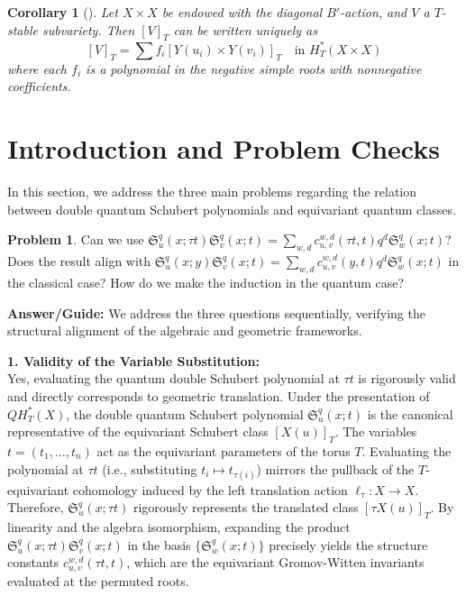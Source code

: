 \documentclass{amsart}
\newtheorem{corollary}[theorem]{Corollary}
\theoremstyle{definition}
\newtheorem{problem}{Problem}
\begin{document}
\begin{corollary}[{\cite[Corollary 6.2]{Mihalcea2006}}]\label{cor:mihalcea_62}
Let $X \times X$ be endowed with the diagonal $B'$-action, and $V$ a $T$-stable subvariety. Then $[V]_T$ can be written uniquely as
$$[V]_T = \sum f_i [Y(u_i) \times Y(v_i)]_T \quad \text{in } H_T^*(X \times X)$$
where each $f_i$ is a polynomial in the negative simple roots with nonnegative coefficients.
\end{corollary}

\section{Introduction and Problem Checks}

In this section, we address the three main problems regarding the relation between double quantum Schubert polynomials and equivariant quantum classes.

\begin{problem}
Can we use $\mathfrak{S}_u^q(x; \tau t) \mathfrak{S}_v^q(x;t) = \sum_{w,d} c_{u,v}^{w,d}(\tau t, t) q^d \mathfrak{S}_w^q(x;t)$? Does the result align with $\mathfrak{S}_u^q(x;y) \mathfrak{S}_v^q(x;t) = \sum_{w,d} c_{u,v}^{w,d}(y, t) q^d \mathfrak{S}_w^q(x;t)$ in the classical case? How do we make the induction in the quantum case?
\end{problem}

\noindent\textbf{Answer/Guide:} We address the three questions sequentially, verifying the structural alignment of the algebraic and geometric frameworks.

\vspace{2mm}
\noindent\textbf{1. Validity of the Variable Substitution:}\\
Yes, evaluating the quantum double Schubert polynomial at $\tau t$ is rigorously valid and directly corresponds to geometric translation. Under the presentation of $QH_T^*(X)$, the double quantum Schubert polynomial $\mathfrak{S}_u^q(x; t)$ is the canonical representative of the equivariant Schubert class $[X(u)]_T$. The variables $t = (t_1, \ldots, t_n)$ act as the equivariant parameters of the torus $T$. Evaluating the polynomial at $\tau t$ (i.e., substituting $t_i \mapsto t_{\tau(i)}$) mirrors the pullback of the $T$-equivariant cohomology induced by the left translation action $\ell_\tau : X \to X$. Therefore, $\mathfrak{S}_u^q(x; \tau t)$ rigorously represents the translated class $[\tau X(u)]_T$. By linearity and the algebra isomorphism, expanding the product $\mathfrak{S}_u^q(x; \tau t) \mathfrak{S}_v^q(x;t)$ in the basis $\{\mathfrak{S}_w^q(x;t)\}$ precisely yields the structure constants $c_{u,v}^{w,d}(\tau t, t)$, which are the equivariant Gromov-Witten invariants evaluated at the permuted roots.
\end{document}
